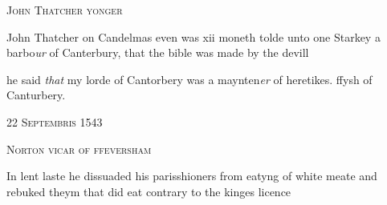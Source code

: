 \documentclass[12pt, a4paper]{book}
\begin{document}
               
                  
				\begin{center}  {\scshape John Thatcher yonger}  \end{center}
			
               	
               		
				\marginpar[\vspace{0.5cm}{\textcolor{Gray}{herecie}}]{}
			
               		
		\ifthenelse{\isodd{\thepage}}
		{\reversemarginpar}
		{\normalmarginpar}
		John Thatcher on Candelmas even was xii moneth
               			tolde unto one Starkey a barbo\textit{ur} of Canterbury, that
 the bible was made by the devill
               	
               	
				\marginpar[\vspace{0.5cm}{\textcolor{Gray}{n}}]{}
			
               	
		\ifthenelse{\isodd{\thepage}}
		{\reversemarginpar}
		{\normalmarginpar}
		he said \textit{that} my lorde of Cantorbery was a maynten\textit{er} of heretikes.
               		ffysh of Canturbery.
 

            
            
               
				\begin{center} \begin{large} {\scshape 
               	22 Septembris 1543
               } \end{large} \end{center}
			
               
               	
				\begin{center}  {\scshape Norton vicar of ffeversham}  \end{center}
			
               	
               		
				\marginpar[\vspace{0.5cm}{\textcolor{Gray}{lent}}]{}
			
               		
		\ifthenelse{\isodd{\thepage}}
		{\reversemarginpar}
		{\normalmarginpar}
		In lent laste he dissuaded his parisshioners from
 eatyng of white meate and rebuked theym that did eat
  contrary to the kinges licence
               	



\dotfill
					  \subsection*{}  \subsection*{}
\end{document}

